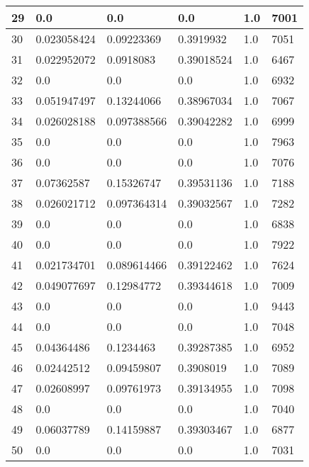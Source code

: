 \begin{longtable}{|l|l|l|l|l|l|}
29 & 0.0 & 0.0 & 0.0 & 1.0 & 7001 \\ \hline 
30 & 0.023058424 & 0.09223369 & 0.3919932 & 1.0 & 7051 \\ \hline 
31 & 0.022952072 & 0.0918083 & 0.39018524 & 1.0 & 6467 \\ \hline 
32 & 0.0 & 0.0 & 0.0 & 1.0 & 6932 \\ \hline 
33 & 0.051947497 & 0.13244066 & 0.38967034 & 1.0 & 7067 \\ \hline 
34 & 0.026028188 & 0.097388566 & 0.39042282 & 1.0 & 6999 \\ \hline 
35 & 0.0 & 0.0 & 0.0 & 1.0 & 7963 \\ \hline 
36 & 0.0 & 0.0 & 0.0 & 1.0 & 7076 \\ \hline 
37 & 0.07362587 & 0.15326747 & 0.39531136 & 1.0 & 7188 \\ \hline 
38 & 0.026021712 & 0.097364314 & 0.39032567 & 1.0 & 7282 \\ \hline 
39 & 0.0 & 0.0 & 0.0 & 1.0 & 6838 \\ \hline 
40 & 0.0 & 0.0 & 0.0 & 1.0 & 7922 \\ \hline 
41 & 0.021734701 & 0.089614466 & 0.39122462 & 1.0 & 7624 \\ \hline 
42 & 0.049077697 & 0.12984772 & 0.39344618 & 1.0 & 7009 \\ \hline 
43 & 0.0 & 0.0 & 0.0 & 1.0 & 9443 \\ \hline 
44 & 0.0 & 0.0 & 0.0 & 1.0 & 7048 \\ \hline 
45 & 0.04364486 & 0.1234463 & 0.39287385 & 1.0 & 6952 \\ \hline 
46 & 0.02442512 & 0.09459807 & 0.3908019 & 1.0 & 7089 \\ \hline 
47 & 0.02608997 & 0.09761973 & 0.39134955 & 1.0 & 7098 \\ \hline 
48 & 0.0 & 0.0 & 0.0 & 1.0 & 7040 \\ \hline 
49 & 0.06037789 & 0.14159887 & 0.39303467 & 1.0 & 6877 \\ \hline 
50 & 0.0 & 0.0 & 0.0 & 1.0 & 7031 \\ \hline 
\end{longtable}